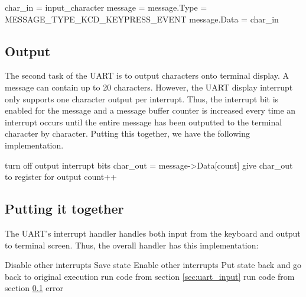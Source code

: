 \documentclass[12pt]{report}
\begin{document}
\begin{algorithmic}
        \State char\_in = input\_character
        \EndIf
        \State message = 
        \State message.Type = MESSAGE\_TYPE\_KCD\_KEYPRESS\_EVENT
        \State message.Data = char\_in
        \State {}
    \EndIf
\end{algorithmic}

\subsection{Output}
\label{sec:uart_output}
The second task of the UART is to output characters onto terminal display. A message can contain up to 20 characters. However, the UART display interrupt only supports one character output per interrupt. Thus, the interrupt bit is enabled for the message and a message buffer counter is increased every time an interrupt occurs until the entire message has been outputted to the terminal character by character. Putting this together, we have the following implementation.

\begin{algorithmic}
            \State {}
            \State turn off output interrupt bits
        \Else
            \State char\_out = message->Data[count]
            \State give char\_out to register for output
            \State count++
        \EndIf
    \EndIf
\end{algorithmic}


\subsection{Putting it together}
The UART's interrupt handler handles both input from the keyboard and output to terminal screen. Thus, the overall handler has this implementation:

\begin{algorithmic}
        \State Disable other interrupts
        \State Save state
        \State {}
        \State Enable other interrupts
        \State Put state back and go back to original execution
    \EndFunction
    \bigskip
            \State run code from section \ref{sec:uart_input}
            \State run code from section \ref{sec:uart_output}
        \Else
            \State error
        \EndIf
    \EndFunction
\end{algorithmic}
\end{document}
